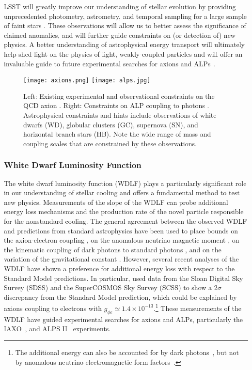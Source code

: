 LSST will greatly improve our understanding of stellar evolution by providing unprecedented photometry, astrometry, and temporal sampling for a large sample of faint stars \citep{0912.0201}.
These observations will allow us to better assess the significance of claimed anomalies, and will further guide constraints on (or detection of) new physics.
A better understanding of astrophysical energy transport will ultimately help shed light on the physics of light, weakly-coupled particles and will offer an invaluable guide to future experimental searches for axions and ALPs~\citep{Irastorza:2018dyq}.

\begin{figure}[t]
\centering
\texttt{[image: axions.png]}
\texttt{[image: alps.jpg]}
\caption{Left: Existing experimental and observational constraints on the QCD axion \citep{Redino:2015}.  
Right: Constraints on ALP coupling to photons \citep{Ringwald:2012}.
Astrophysical constraints and hints include observations of white dwarfs (WD), globular clusters (GC), supernova (SN), and horizontal branch stars (HB).
Note the wide range of mass and coupling scales that are constrained by these observations.
\label{fig:axions}
}
\end{figure}

\subsubsection{White Dwarf Luminosity Function}

The white dwarf luminosity function (WDLF) plays a particularly significant role in our understanding of stellar cooling and offers a fundamental method to test new physics.
Measurements of the slope of the WDLF can probe additional energy loss mechanisms and the production rate of the novel particle responsible for the nonstandard cooling.
The general agreement between the observed WDLF and predictions from standard astrophysics have been used to place bounds on the axion-electron coupling \citep{Isern:2008nt,Bertolami:2014wua}, on the anomalous neutrino magnetic moment \citep{Bertolami:2014noa}, on the kinematic coupling of dark photons to standard photons \citep{Chang:2016qfl}, and on the variation of the gravitational constant \citep{Althaus:2011ca}.
However, several recent analyses of the WDLF have shown a preference for additional energy loss with respect to the Standard Model predictions.
In particular, \cite{Bertolami:2014wua} used data from the Sloan Digital Sky Survey (SDSS) and the SuperCOSMOS Sky Survey (SCSS) to show a $2 \sigma$ discrepancy from the Standard Model prediction, which could be explained by axions coupling to electrons with $g_{\phi e}\simeq 1.4\times 10^{-13}$.\footnote{The additional energy can also be accounted for by dark photons~\citep{Giannotti:2015kwo,Chang:2016qfl}, but not by anomalous neutrino electromagnetic form factors~\citep{Bertolami:2014noa}.}
These measurements of the WDLF have guided experimental searches for axions and ALPs, particularly the IAXO~\citep{Irastorza:2011gs,Armengaud:2014gea}, and ALPS II~\citep{Bahre:2013ywa,ALPSII} experiments.

